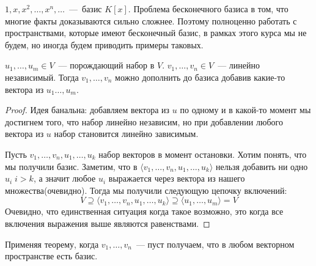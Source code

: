 \begin{example}
    $1, x, x^2, \dots, x^n, \dots$~---~базис $K[x]$. 
    Проблема бесконечного базиса в том, что многие факты доказываются сильно сложнее.
    Поэтому полноценно работать с пространствами, которые имеют бесконечный базис, в рамках этого
    курса мы не будем, но иногда будем приводить примеры таковых.
\end{example}
\begin{theorem}
    $u_1,\dots,u_m\in V$~--- порождающий набор в $V$. $v_1,\dots,v_n\in V$~---
    линейно независимый. Тогда $v_1,\dots, v_n$ можно дополнить до базиса добавив
    какие-то вектора из $u_1\dots, u_m$.
\end{theorem}
\begin{proof}
Идея банальна: добавляем вектора из $u$ по одному и в какой-то момент мы достигнем того, что набор
линейно независим, но при добавлении любого вектора из $u$ набор становится линейно
зависимым.

Пусть $v_1,\dots,v_n, u_1,\dots, u_k$ набор векторов в момент остановки. Хотим понять, что
мы получили базис.
Заметим, что в $\langle v_1,\dots,v_n,u_1,\dots,u_k\rangle$ нельзя добавить ни одно $u_i\; i > k$, а значит
любое $u_i$ выражается через вектора из нашего множества(очевидно). Тогда мы получили
следующую цепочку включений:
\[
    V\supseteq \langle v_1,\dots,v_n, u_1,\dots,u_k\rangle \supseteq \langle u_1,\dots,u_m\rangle=V
\] 
Очевидно, что единственная ситуация когда такое возможно, это когда все включения
выражения выше являются равенствами.
\end{proof}
\begin{follow}
    Применяя теорему, когда $v_1,\dots,v_n$~--- пуст получаем, что в любом векторном 
    пространстве есть базис.
\end{follow}
